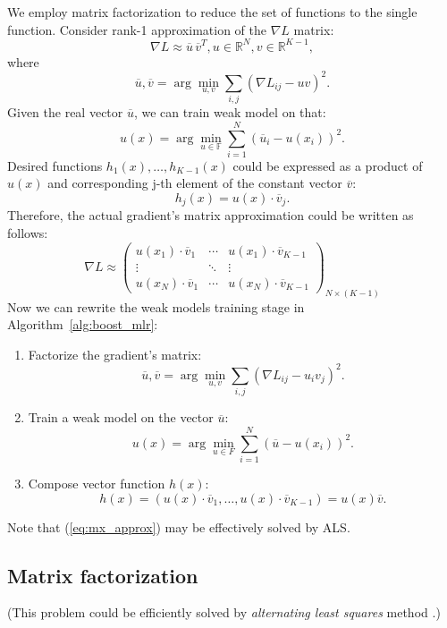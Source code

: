 \documentclass{article}
\begin{document}
We employ matrix factorization to reduce the set of functions to the single function. Consider rank-1 approximation of the $\nabla L$ matrix:
\[
	\nabla L \approx \overline{u} \, \overline{v}^{T}, u \in \mathbb{R}^{N},v \in \mathbb{R}^{K-1},
\]
where
\begin{equation}
	\overline{u},\overline{v} =
	\arg\min_{u, v} \sum_{i,j}(\nabla L_{ij}-uv)^{2}. \label{eq:mx_approx}
\end{equation}
Given the real vector $\overline{u}$, we can train weak model on that:
\[
	u(x) = \arg\min_{u \in \mathbb{F}} \sum_{i=1}^{N}\left(\overline{u}_i-u(x_{i})\right)^{2}.
\]
Desired functions $h_{1}(x),\dots,h_{K-1}(x)$ could be expressed as a product of $u(x)$ and corresponding j-th element of the constant vector $\overline{v}$:
\[
h_{j}(x)=u(x)\cdot\overline{v}_{j}.
\]
Therefore, the actual gradient's matrix approximation could be written as follows:
\[
	\nabla L \approx
	\begin{pmatrix}
		u(x_{1})\cdot\overline{v}_{1} & \cdots & u(x_{1})\cdot\overline{v}_{K-1} \\
							   \vdots & \ddots & \vdots \\
		u(x_{N})\cdot\overline{v}_{1} & \cdots & u(x_{N})\cdot\overline{v}_{K-1}
	\end{pmatrix}_{N\times(K-1)}
\]
Now we can rewrite the weak models training stage in Algorithm~\ref{alg:boost_mlr}:
\begin{enumerate}
\item Factorize the gradient's matrix:
\[
\overline{u},\overline{v} = \arg\min_{u,v}\sum_{i,j}(\nabla L_{ij}-u_{i}v_{j})^{2}.
\]

\item Train a weak model on the vector $\overline{u}$: \label{eq:u_train}
\begin{equation}
	u(x)=\arg\min_{u\in F}\sum_{i=1}^{N}\left(\overline{u}-u(x_{i})\right)^{2}.
\end{equation}

\item Compose vector function $h(x)$:
\[
	h(x) =
	(u(x)\cdot\overline{v}_{1},\dots,u(x)\cdot\overline{v}_{K-1})=u(x)\overline{v}.
\]
\end{enumerate}
Note that (\ref{eq:mx_approx}) may be effectively solved by ALS\cite{Hu08collaborativefiltering}.


\subsection{Matrix factorization}
(This problem could be efficiently solved by \emph{alternating least squares} method \cite{Hu08collaborativefiltering}.)
\end{document}
